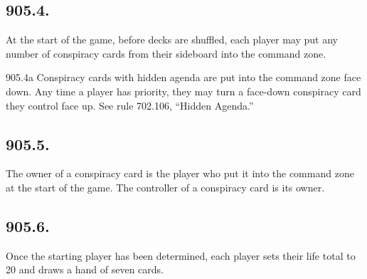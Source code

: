 \subsection*{905.4.}
At the start of the game, before decks are shuffled, each player may put any number of conspiracy cards from their sideboard into the command zone.

905.4a Conspiracy cards with hidden agenda are put into the command zone face down. Any time a player has priority, they may turn a face-down conspiracy card they control face up. See rule 702.106, “Hidden Agenda.”

\subsection*{905.5.}
The owner of a conspiracy card is the player who put it into the command zone at the start of the game. The controller of a conspiracy card is its owner.

\subsection*{905.6.}
Once the starting player has been determined, each player sets their life total to 20 and draws a hand of seven cards.
